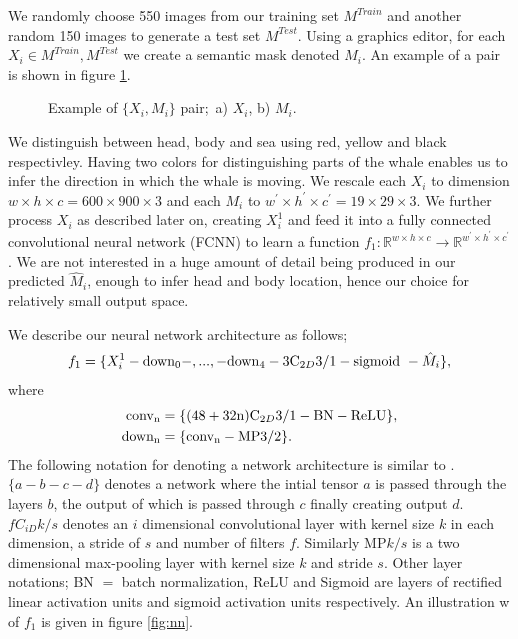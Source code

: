 \documentclass{IET}%
\newcommand{\real}{\mathbb{R}}
\begin{document}
We randomly choose 550 images from our training set $M^{Train}$ and another random 150 images to generate a test set $M^{Test}$. Using a graphics editor, for each $X_i \in {M^{Train}, M^{Test}}$ we create a semantic mask denoted $M_i$. An example of a pair is shown in figure \ref{fig:whaleLabel}.
\begin{figure}[H]
\centering     %
{}
\caption{Example of $\{X_i,M_i\}$ pair;\
a) $X_i$, b) $M_i$.
}\label{fig:whaleLabel}
\end{figure}
We distinguish between head, body and sea using red, yellow and black respectivley. Having two colors for distinguishing parts of the whale enables us to infer the direction in which the whale is moving. We rescale each $X_i$ to dimension $w \times h \times c = 600 \times 900 \times 3$ and each $M_i$ to $w^{'}\times h^{'}\times c^{'} = 19 \times 29 \times 3$. We further process $X_i$ as described later on, creating $X_i^1$ and feed it into a fully connected convolutional neural network (FCNN) to learn a function $f_1: \real^{w\times h \times c} \to \real^{w^{'}\times h^{'}\times c^{'}}$. We are not interested in a huge amount of detail being produced in our predicted $\hat{M}_i$, enough to infer head and body location, hence our choice for relatively small output space.

We describe our neural network architecture as follows;
\begin{align}\label{eq:whaleconv1}
	 f_1 = \{X_i^1 - \text{down\textsubscript{0}} - , ... , - \text{down\textsubscript{4}} - 3\text{C}_{2D}3/1 - \text{sigmoid}\ - \hat{M}_i \}, 
\end{align}
	where 
\begin{align}
			 \text{conv\textsubscript{n}} &= \{(48 + 32\text{n})\text{C}_{2D}3/1 - \text{BN} - \text{ReLU}\}, \\	
     		 \text{down\textsubscript{n}}  &= \{\text{conv\textsubscript{n}}- \text{MP}3/2\}.
     		 \label{eq:whaleconv1block}
\end{align}
The following notation for denoting a network architecture is similar to \cite{graham2014fractional}. $\{a-b-c-d\}$ denotes a network where the intial tensor $a$ is passed through the layers $b$, the output of which is passed through $c$ finally creating output $d$. $fC_{iD}k/s$ denotes an $i$ dimensional convolutional layer with kernel size $k$ in each dimension, a stride of $s$ and number of filters $f$. Similarly MP$k/s$ is a two dimensional max-pooling layer with kernel size $k$ and stride $s$. Other layer notations; BN $=$ batch normalization, ReLU and Sigmoid are layers of rectified linear activation units and sigmoid activation units respectively. An illustration w of $f_1$ is given in figure \ref{fig:nn}.
\end{document}
